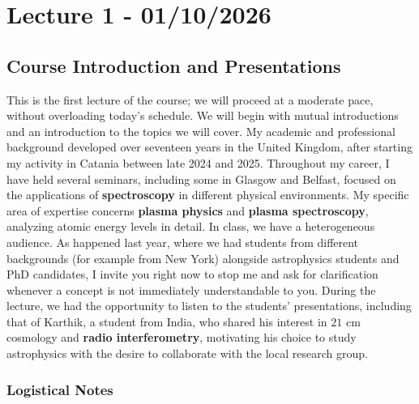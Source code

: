 \chapter{Lecture 1 - 01/10/2026}

\section{Course Introduction and Presentations}

This is the first lecture of the course; we will proceed at a moderate pace, without overloading today's schedule. We will begin with mutual introductions and an introduction to the topics we will cover. My academic and professional background developed over seventeen years in the United Kingdom, after starting my activity in Catania between late 2024 and 2025. Throughout my career, I have held several seminars, including some in Glasgow and Belfast, focused on the applications of \textbf{spectroscopy} in different physical environments. My specific area of expertise concerns \textbf{plasma physics} and \textbf{plasma spectroscopy}, analyzing atomic energy levels in detail. In class, we have a heterogeneous audience. As happened last year, where we had students from different backgrounds (for example from New York) alongside astrophysics students and PhD candidates, I invite you right now to stop me and ask for clarification whenever a concept is not immediately understandable to you. During the lecture, we had the opportunity to listen to the students' presentations, including that of Karthik, a student from India, who shared his interest in $21\text{ cm}$ cosmology and \textbf{radio interferometry}, motivating his choice to study astrophysics with the desire to collaborate with the local research group.

    \subsection{Logistical Notes}
    
